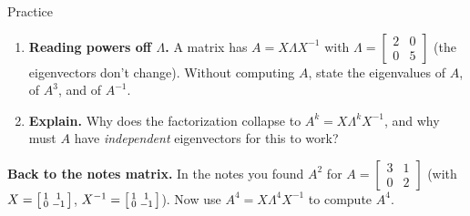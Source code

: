 \documentclass[10pt]{article}
\begin{document}
\begin{notesbox}{Practice}
\begin{enumerate}[leftmargin=1.9em, itemsep=12pt]
  \item \textbf{Reading powers off $\Lambda$.} A matrix has $A=X\Lambda X^{-1}$ with
        $\Lambda=\begin{bmatrix} 2 & 0 \\ 0 & 5 \end{bmatrix}$ (the eigenvectors don't change). Without
        computing $A$, state the eigenvalues of $A$, of $A^{3}$, and of $A^{-1}$.
  \item \textbf{Explain.} Why does the factorization collapse to $A^k=X\Lambda^k X^{-1}$, and why must $A$
        have \emph{independent} eigenvectors for this to work?
\end{enumerate}
\end{notesbox}

\begin{extensionbox}
\textbf{Back to the notes matrix.} In the notes you found $A^2$ for $A=\begin{bmatrix} 3 & 1 \\ 0 & 2 \end{bmatrix}$
(with $X=\begin{bsmallmatrix}1&1\\0&-1\end{bsmallmatrix}$, $X^{-1}=\begin{bsmallmatrix}1&1\\0&-1\end{bsmallmatrix}$).
Now use $A^4=X\Lambda^4 X^{-1}$ to compute $A^4$.
\end{extensionbox}
\end{document}
